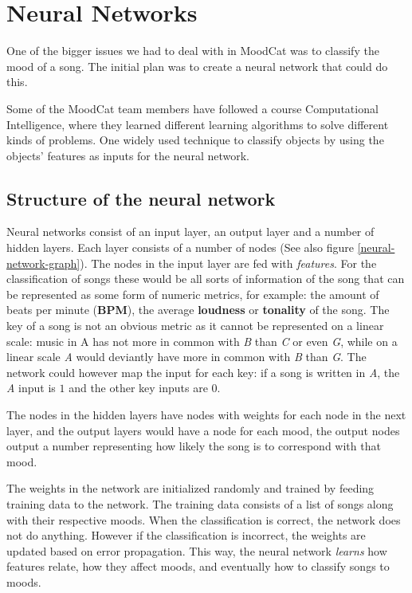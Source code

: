 \chapter{Neural Networks}
\label{appendix-neural-networks}

One of the bigger issues we had to deal with in MoodCat was to classify the mood of a song.
The initial plan was to create a neural network that could do this.

Some of the MoodCat team members have followed a course Computational Intelligence,
where they learned different learning algorithms to solve different kinds of problems.
One widely used technique to classify objects by using the objects' features as inputs for the neural network.

\section{Structure of the neural network}
Neural networks consist of an input layer, an output layer and a number of hidden layers.
Each layer consists of a number of nodes (See also figure \ref{neural-network-graph}).
The nodes in the input layer are fed with \textit{features}.
For the classification of songs these would be all sorts of information of the song that can be represented as some form of numeric metrics, for example: the amount of beats per minute (\textbf{BPM}), the average \textbf{loudness} or \textbf{tonality} of the song.
The key of a song is not an obvious metric as it cannot be represented on a linear scale: music in A has not more in common with \textit{B} than \textit{C} or even \textit{G}, while on a linear scale \textit{A} would deviantly have more in common with \textit{B} than \textit{G}.
The network could however map the input for each key: if a song is written in \textit{A}, the \textit{A} input is $1$ and the other key inputs are $0$.

The nodes in the hidden layers have nodes with weights for each node in the next layer,
and the output layers would have a node for each mood, the output nodes output a number representing how likely the song
is to correspond with that mood.

The weights in the network are initialized randomly and trained by feeding training data to the network.
The training data consists of a list of songs along with their respective moods.
When the classification is correct, the network does not do anything.
However if the classification is incorrect, the weights are updated based on error propagation.
This way, the neural
network \textit{learns} how features relate, how they affect moods, and eventually how to classify songs to moods.

